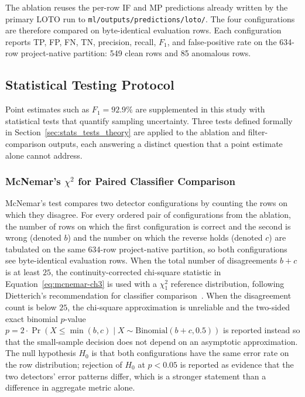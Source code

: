 The ablation reuses the per-row IF and MP predictions already written by the primary LOTO run to \texttt{ml/outputs/predictions/\allowbreak loto/}. The four configurations are therefore compared on byte-identical evaluation rows. Each configuration reports TP, FP, FN, TN, precision, recall, $F_1$, and false-positive rate on the 634-row project-native partition: 549 clean rows and 85 anomalous rows.

\subsection{Statistical Testing Protocol}
\label{sec:stats_testing_protocol}

Point estimates such as $F_1 = 92.9\%$ are supplemented in this study with statistical tests that quantify sampling uncertainty. Three tests defined formally in Section~\ref{sec:stats_tests_theory} are applied to the ablation and filter-comparison outputs, each answering a distinct question that a point estimate alone cannot address.

\subsubsection{McNemar's $\chi^{2}$ for Paired Classifier Comparison}
\label{sec:proto_mcnemar}

McNemar's test compares two detector configurations by counting the rows on which they disagree. For every ordered pair of configurations from the ablation, the number of rows on which the first configuration is correct and the second is wrong (denoted $b$) and the number on which the reverse holds (denoted $c$) are tabulated on the same 634-row project-native partition, so both configurations see byte-identical evaluation rows. When the total number of disagreements $b + c$ is at least $25$, the continuity-corrected chi-square statistic in Equation~\ref{eq:mcnemar-ch3} is used with a $\chi^{2}_{1}$ reference distribution, following Dietterich's recommendation for classifier comparison~\cite{dietterich1998approximate}. When the disagreement count is below $25$, the chi-square approximation is unreliable and the two-sided exact binomial $p$-value $p = 2 \cdot \Pr(X \leq \min(b, c) \mid X \sim \mathrm{Binomial}(b + c, 0.5))$ is reported instead so that the small-sample decision does not depend on an asymptotic approximation. The null hypothesis $H_0$ is that both configurations have the same error rate on the row distribution; rejection of $H_0$ at $p < 0.05$ is reported as evidence that the two detectors' error patterns differ, which is a stronger statement than a difference in aggregate metric alone.

